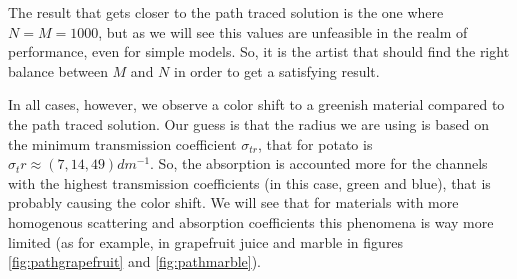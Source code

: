 The result that gets closer to the path traced solution is the one where $N = M = 1000$, but as we will see this values are unfeasible in the realm of performance, even for simple models. So, it is the artist that should find the right balance between $M$ and $N$ in order to get a satisfying result. 

In all cases, however, we observe a color shift to a greenish material compared to the path traced solution. Our guess is that the radius we are using is based on the minimum transmission coefficient $\sigma_{tr}$, that for potato is $\sigma_tr \approx (7, 14, 49) dm^{-1}$. So, the absorption is accounted more for the channels with the highest transmission coefficients (in this case, green and blue), that is probably causing the color shift. We will see that for materials with more homogenous scattering and absorption coefficients this phenomena is way more limited (as for example, in grapefruit juice and marble in figures  \ref{fig:pathgrapefruit} and \ref{fig:pathmarble}).

